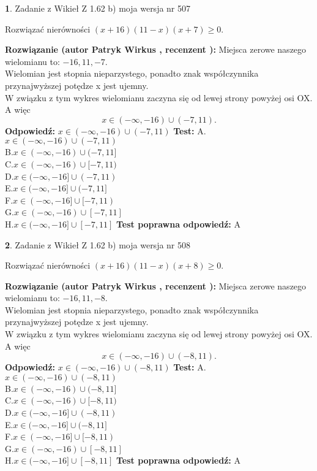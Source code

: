 \documentclass[12pt, a4paper]{article}
\theoremstyle{definition} %
\newtheorem{zad}{}
\newcommand{\zadStart}[1]{\begin{zad}#1\newline}
\newcommand{\zadStop}{\end{zad}}
\newcommand{\rozwStart}[2]{\noindent \textbf{Rozwiązanie (autor #1 , recenzent #2): }\newline}
\newcommand{\rozwStop}{\newline}
\newcommand{\odpStart}{\noindent \textbf{Odpowiedź:}\newline}
\newcommand{\odpStop}{\newline}
\newcommand{\testStart}{\noindent \textbf{Test:}\newline}
\newcommand{\testStop}{\newline}
\newcommand{\kluczStart}{\noindent \textbf{Test poprawna odpowiedź:}\newline}
\newcommand{\kluczStop}{\newline}
\begin{document}
\zadStart{Zadanie z Wikieł Z 1.62 b) moja wersja nr 507}

Rozwiązać nierówności $(x+16)(11-x)(x+7)\ge0$.
\zadStop
\rozwStart{Patryk Wirkus}{}
Miejsca zerowe naszego wielomianu to: $-16, 11, -7$.\\
Wielomian jest stopnia nieparzystego, ponadto znak współczynnika przy\linebreak najwyższej potędze x jest ujemny.\\ W związku z tym wykres wielomianu zaczyna się od lewej strony powyżej osi OX. A więc $$x \in (-\infty,-16) \cup (-7,11).$$
\rozwStop
\odpStart
$x \in (-\infty,-16) \cup (-7,11)$
\odpStop
\testStart
A.$x \in (-\infty,-16) \cup (-7,11)$\\
B.$x \in (-\infty,-16) \cup (-7,11]$\\
C.$x \in (-\infty,-16) \cup [-7,11)$\\
D.$x \in (-\infty,-16] \cup (-7,11)$\\
E.$x \in (-\infty,-16] \cup (-7,11]$\\
F.$x \in (-\infty,-16] \cup [-7,11)$\\
G.$x \in (-\infty,-16) \cup [-7,11]$\\
H.$x \in (-\infty,-16] \cup [-7,11]$
\testStop
\kluczStart
A
\kluczStop



\zadStart{Zadanie z Wikieł Z 1.62 b) moja wersja nr 508}

Rozwiązać nierówności $(x+16)(11-x)(x+8)\ge0$.
\zadStop
\rozwStart{Patryk Wirkus}{}
Miejsca zerowe naszego wielomianu to: $-16, 11, -8$.\\
Wielomian jest stopnia nieparzystego, ponadto znak współczynnika przy\linebreak najwyższej potędze x jest ujemny.\\ W związku z tym wykres wielomianu zaczyna się od lewej strony powyżej osi OX. A więc $$x \in (-\infty,-16) \cup (-8,11).$$
\rozwStop
\odpStart
$x \in (-\infty,-16) \cup (-8,11)$
\odpStop
\testStart
A.$x \in (-\infty,-16) \cup (-8,11)$\\
B.$x \in (-\infty,-16) \cup (-8,11]$\\
C.$x \in (-\infty,-16) \cup [-8,11)$\\
D.$x \in (-\infty,-16] \cup (-8,11)$\\
E.$x \in (-\infty,-16] \cup (-8,11]$\\
F.$x \in (-\infty,-16] \cup [-8,11)$\\
G.$x \in (-\infty,-16) \cup [-8,11]$\\
H.$x \in (-\infty,-16] \cup [-8,11]$
\testStop
\kluczStart
A
\kluczStop
\end{document}
